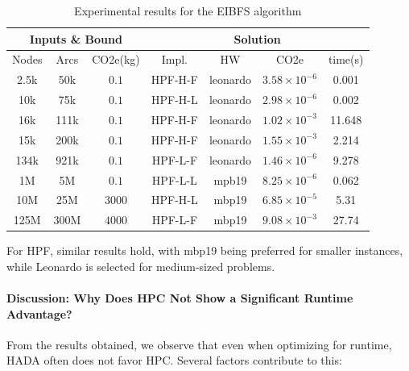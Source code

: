 \documentclass[a4paper,singleside,12pt]{report} %
\begin{document}
\begin{table}[h!]
    \centering
    \begin{tabular}{|ccc|cccc|}
        \hline
        \multicolumn{3}{|c|}{Inputs \& Bound} & \multicolumn{4}{c|}{Solution} \\
        \hline
        Nodes & Arcs & CO2e(kg) & Impl. & HW & CO2e & time(s) \\
        \hline
        2.5k & 50k & $0.1$ & HPF-H-F & leonardo & $3.58 \times 10^{-6}$ & 0.001 \\
        10k & 75k & $0.1$ & HPF-H-L & leonardo & $2.98 \times 10^{-6}$ & 0.002 \\
        16k & 111k & $0.1$ & HPF-H-F & leonardo & $1.02 \times 10^{-3}$ & 11.648 \\
        15k & 200k & $0.1$ & HPF-H-F & leonardo & $1.55 \times 10^{-3}$ & 2.214 \\
        134k & 921k & $0.1$ & HPF-L-F & leonardo & $1.46 \times 10^{-6}$ & 9.278 \\
        1M & 5M & $0.1$ & HPF-L-L & mpb19 & $8.25 \times 10^{-6}$ & 0.062 \\
        10M & 25M & $3000$ & HPF-H-L & mbp19 & $6.85 \times 10^{-5}$ & 5.31 \\
        125M & 300M & $4000$ & HPF-L-F & mbp19 & $9.08 \times 10^{-3}$ & 27.74 \\
        \hline
    \end{tabular}
    \caption{Experimental results for the EIBFS algorithm}
    \label{tab:hpf_results_runtime}
\end{table}

For HPF, similar results hold, with mbp19 being preferred for smaller instances, while Leonardo is selected for medium-sized problems.

\paragraph{Discussion: Why Does HPC Not Show a Significant Runtime Advantage?}

From the results obtained, we observe that even when optimizing for runtime, HADA often does not favor HPC. Several factors contribute to this:
\end{document}
